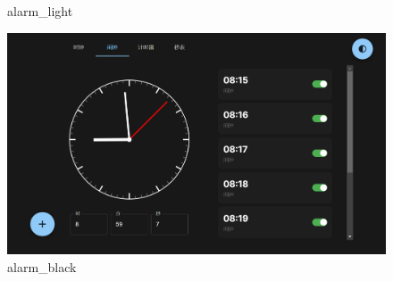 \documentclass[a4paper,11pt]{article}
\begin{document}
\begin{figure}[!h]
\begin{minipage}{0.48\textwidth}
        \caption{alarm\_light}
    \end{minipage}\hfill
    \begin{minipage}{0.48\textwidth}
        \centering
        \includegraphics[width=\linewidth]{image/alarm_black.png}
        \caption{alarm\_black}
    \end{minipage}\hfill
    
\end{figure}
\end{document}
